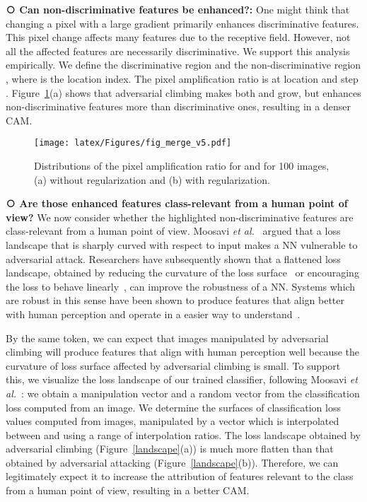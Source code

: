 \documentclass[final]{cvpr}
\begin{document}
\textbf{\textcircled{\raisebox{-0.9pt}{1}} Can non-discriminative features be enhanced?:} One might think that changing a pixel with a large gradient primarily enhances discriminative features. 
This pixel change affects many features due to the receptive field. However, not all the affected features are necessarily discriminative.
We support this analysis empirically.
We define the discriminative region  and the non-discriminative region , where  is the location index. 
The pixel amplification ratio  is  at location  and step .
Figure~\ref{fig_amp}(a) shows that adversarial climbing makes both  and  grow, but enhances non-discriminative features more than discriminative ones, resulting in a denser CAM.

\begin{figure}[t]
\centering
\texttt{[image: latex/Figures/fig\_merge\_v5.pdf]}
\vspace{-2em}
\caption{\label{fig_amp} Distributions of the pixel amplification ratio  for  and  for 100 images, (a) without regularization and (b) with regularization.}
\vspace{-1em}
\end{figure}
 
\textbf{\textcircled{\raisebox{-0.9pt}{2}} Are those enhanced features class-relevant from a human point of view?}
We now consider whether the highlighted non-discriminative features are class-relevant from a human point of view.
Moosavi \textit{et al.}~\cite{moosavi2019robustness} argued that a loss landscape that is sharply curved with respect to input makes a NN vulnerable to adversarial attack.
Researchers have subsequently shown that a flattened loss landscape, obtained by reducing the curvature of the loss surface~\cite{moosavi2019robustness} or encouraging the loss to behave linearly~\cite{qin2019adversarial}, can improve the robustness of a NN.
Systems which are robust in this sense have been shown to produce features that align better with human perception and operate in a easier way to understand~\cite{santurkar2019image, tsipras2018robustness, ilyas2019adversarial}.




By the same token, we can expect that images manipulated by adversarial climbing will produce features that align with human perception well because the curvature of loss surface affected by adversarial climbing is small.
To support this, we visualize the loss landscape of our trained classifier, following Moosavi \textit{et al.}~\cite{moosavi2019robustness}: we obtain a manipulation vector  and a random vector  from the classification loss  computed from an image. 
We determine the surfaces of classification loss values computed from images, manipulated by a vector which is interpolated between  and  using a range of interpolation ratios.
The loss landscape obtained by adversarial climbing (Figure~\ref{landscape}(a)) is much more flatten than that obtained by adversarial attacking (Figure~\ref{landscape}(b)).
Therefore, we can legitimately expect it to increase the attribution of features relevant to the class from a human point of view, resulting in a better CAM.
\end{document}
